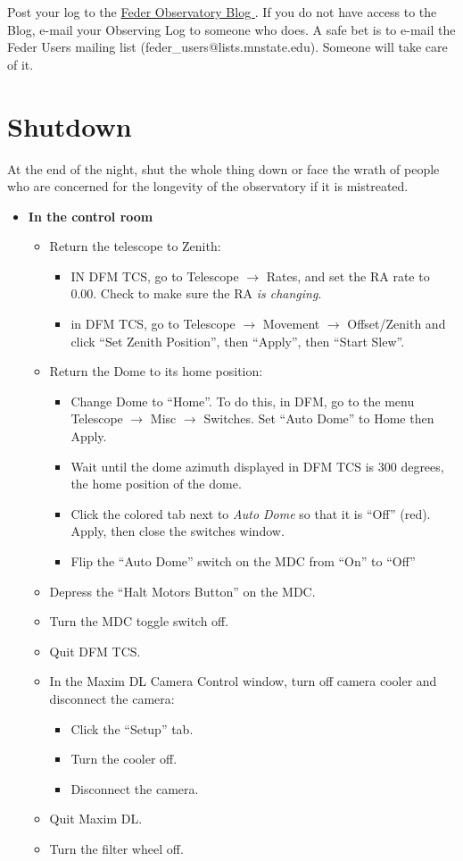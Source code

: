 \documentclass[letterpaper, 12pt]{report}
\begin{document}
Post your log to the \href{(http://astronomy.mnstate.edu/Feder_Observatory/}{Feder Observatory Blog }. If you do not have access to the Blog, e-mail your Observing Log to someone who does. A safe bet is to e-mail the Feder Users mailing list (feder\_users@lists.mnstate.edu). Someone will take care of it.

\newpage

\chapter{Shutdown}\label{ch:shutdown}
At the end of the night, shut the whole thing down or face the wrath of people who are concerned for the longevity of the observatory if it is mistreated.
\begin{itemize}
	\item {\large \textbf{In the control room}}
	\begin{itemize}
		\item Return the telescope to Zenith:
			\begin{itemize}
				\item IN DFM TCS, go to Telescope $\rightarrow$ Rates, and set the RA rate to 0.00. Check to make sure the RA \emph{is changing}.
				\item in DFM TCS, go to Telescope $\rightarrow$ Movement $\rightarrow$ Offset/Zenith and click ``Set Zenith Position'', then ``Apply'', then ``Start Slew''.
			\end{itemize}
		\item Return the Dome to its home position:
			\begin{itemize}
				\item Change Dome to ``Home''. To do this, in DFM, go to the menu Telescope $\rightarrow$ Misc $\rightarrow$ Switches. Set ``Auto Dome'' to Home then Apply.
				\item Wait until the dome azimuth displayed in DFM TCS is 300 degrees, the home position of the dome.
				\item Click the colored tab next to \emph{Auto Dome} so that it is ``Off'' (red). Apply, then close the switches window.
				\item Flip the ``Auto Dome'' switch on the MDC from ``On'' to ``Off''
			\end{itemize}
		\item Depress the ``Halt Motors Button'' on the MDC.
		\item Turn the MDC toggle switch off.
		\item Quit DFM TCS.
		\item In the Maxim DL Camera Control window, turn off camera cooler and disconnect the camera:
			\begin{itemize}
				\item Click the ``Setup'' tab.
				\item Turn the cooler off.
				\item Disconnect the camera.
			\end{itemize}
		\item Quit Maxim DL.
		\item Turn the filter wheel off.
	\end{itemize}


\end{itemize}
\end{document}
